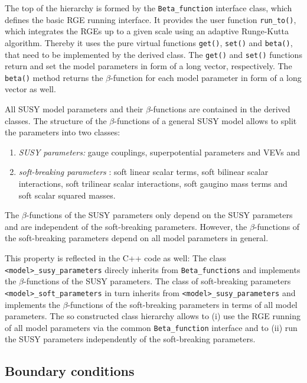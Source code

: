 \documentclass[final,3p,11pt,pdflatex]{elsarticle}
\newcommand{\code}[1]{\lstinline|#1|}  %
\begin{document}
The top of the hierarchy is formed by the \code{Beta_function}
interface class, which defines the basic RGE running interface.  It
provides the user function \code{run_to()}, which integrates the RGEs
up to a given scale using an adaptive Runge-Kutta algorithm.  Thereby
it uses the pure virtual functions \code{get()}, \code{set()} and
\code{beta()}, that need to be implemented by the derived class.  The
\code{get()} and \code{set()} functions return and set the model
parameters in form of a long vector, respectively.  The \code{beta()}
method returns the $\beta$-function for each model parameter in form
of a long vector as well.

All SUSY model parameters and their $\beta$-functions are contained in
the derived classes.  The structure of the $\beta$-functions of a
general SUSY model
\cite{Jones:1974pg,Jones:1983vk,West:1984dg,Martin:1993yx,Yamada:1993ga,MV94,Fonseca:2011vn,Sperling:2013eva,Sperling:2013xqa}
allows to split the parameters into two classes:
%
\begin{enumerate}
\item \emph{SUSY parameters:} gauge couplings, superpotential
  parameters and VEVs and
\item \emph{soft-breaking parameters} \cite{Girardello:1981wz}: soft
  linear scalar terms, soft bilinear scalar interactions, soft
  trilinear scalar interactions, soft gaugino mass terms and soft
  scalar squared masses.
\end{enumerate}
%
The $\beta$-functions of the SUSY parameters only depend on the
SUSY parameters and are independent of the soft-breaking
parameters.  However, the $\beta$-functions of the soft-breaking
parameters depend on all model parameters in general.

This property is reflected in the C++ code as well: The class
\code{<model>_susy_parameters} direcly inherits from
\code{Beta_functions} and implements the $\beta$-functions of the SUSY
parameters.  The class of soft-breaking parameters
\code{<model>_soft_parameters} in turn inherits from
\code{<model>_susy_parameters} and implements the $\beta$-functions of
the soft-breaking parameters in terms of all model parameters.  The so
constructed class hierarchy allows to (i) use the RGE running of all
model parameters via the common \code{Beta_function} interface and to
(ii) run the SUSY parameters independently of the soft-breaking
parameters.

\subsection{Boundary conditions}
\label{sec:boundary-conditions}
\end{document}
